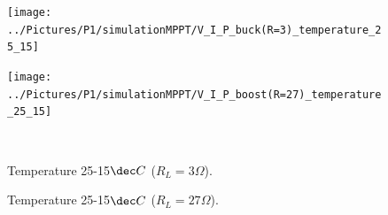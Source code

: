 \vspace{1cm}
\begin{figure}[H]
	\begin{minipage}[c]{0.6\textwidth}
		\centering
		\texttt{[image: ../Pictures/P1/simulationMPPT/V\_I\_P\_buck(R=3)\_temperature\_25\_15]} %
	\end{minipage}%
	\hfill
	\begin{minipage}[c]{0.6\textwidth}
		\centering
		\texttt{[image: ../Pictures/P1/simulationMPPT/V\_I\_P\_boost(R=27)\_temperature\_25\_15]} %
	\end{minipage} \\ %
	\begin{minipage}[t]{0.6\textwidth}
		\caption{Temperature 25-15$\dec C$ ($R_{L}=3\Omega$).} %
		\label{bucktemperature}
	\end{minipage}%
	\hfill
	\begin{minipage}[t]{0.6\textwidth}
		\caption{Temperature 25-15$\dec C$ ($R_{L}=27\Omega$).} %
		\label{boosttemperature}
	\end{minipage}
\end{figure}



